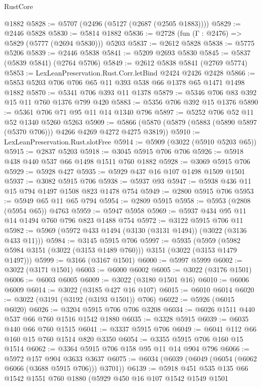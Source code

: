 \begin{lexlean}{RustCore}
\begin{coremodule}
    @1882
@5828 := @5707 (@2496 (@5127 (@2687 (@2505 @1883))))
@5829 := @2446 @5828
@5830 := @5814 @1882
@5836 := @2728 (fun (Γ : @2476) => @5829 (@5777 (@2694 @5830))) @5203
@5837 := @2612 @5828
@5838 := @5775 @5206
@5839 := @2446 @5838
@5841 := @5209 @2693 @5830
@5845 := @5837 (@5839 @5841) (@2764 @5706)
@5849 := @2612 @5838 @5841 (@2769 @5774)
@5853 := LexLeanPreservation.Rust.Corr.letBind @2424 @2426 @2428
@5866 := @5853 @5203 @706 @706 @65 @11 @393 @538 @66 @1378 @65 @1471 @1498 @1882
@5870 := @5341 @706 @393 @11 @1378
@5879 := @5346 @706 @83 @392 @15 @11 @760 @1376 @799 @420
@5883 := @5356 @706 @392 @15 @1376
@5890 := @5361 @706 @71 @95 @11 @14 @1340 @796
@5897 := @5252 @706 @52 @11 @52 @1340 @5260 @5263
@5909 := @5866 (@5870 (@5879 (@5883 (@5890 @5897 (@5370 @706))) @4266 @4269 @4272 @4275 @3819))
@5910 := LexLeanPreservation.Rust.slotFree
@5914 := @5909 (@3022 (@5910 @5203 @65))
@5915 := @2837 @5203
@5918 := @3045 @5915 @706 @706
@5926 := @5918 @438 @440 @537 @66 @1498 @1511 @760 @1882
@5928 := @3069 @5915 @706
@5929 := @5928 @427
@5935 := @5929 @437 @16 @107 @1498 @1509 @1501
@5937 := @3082 @5915 @706
@5938 := @5937 @93
@5947 := @5938 @436 @11 @15 @794 @1497 @1508 @823 @1478 @754
@5949 := @2800 @5915 @706
@5953 := @5949 @65 @11 @65 @794
@5954 := @2809 @5915
@5958 := @5953 (@2808 (@5954 @65)) @4763
@5959 := @5947 @5958
@5969 := @5937 @434 @95 @11 @14 @1494 @760 @796 @823 @1488 @754
@5972 := @3122 @5915 @706 @11
@5982 := @5969 (@5972 @433 @1494 (@3130 (@3131 @1494)) (@3022 (@3136 @433 @11)))
@5984 := @3145 @5915 @706
@5997 := @5935
    (@5959 (@5982 @5984 @3151 (@3022 (@3153 @1489 @760))) @3151 (@3022 (@3153 @1479 @1497)))
@5999 := @3166 (@3167 @1501)
@6000 := @5997 @5999
@6002 := @3022 (@3171 @1501)
@6003 := @6000 @6002
@6005 := @3022 (@3176 @1501)
@6006 := @6003 @6005
@6009 := @3022 (@3180 @1501 @16)
@6010 := @6006 @6009
@6014 := @3022 (@3185 @427 @16 @107)
@6015 := @6010 @6014
@6020 := @3022 (@3191 (@3192 (@3193 @1501)) @706)
@6022 := @5926 (@6015 @6020)
@6026 := @3204 @5915 @706 @706 @3208
@6034 := @6026 @1511 @440 @537 @66 @760 @1516 @1542 @1880
@6035 := @3328 @5915
@6039 := @6035 @440 @66 @760 @1515
@6041 := @3337 @5915 @706
@6049 := @6041 @112 @66 @160 @15 @760 @1514 @820 @3350
@6054 := @3355 @5915 @706 @160 @15 @1514
@6062 := @3364 @5915 @706 @158 @95 @11 @14 @904 @796
@6066 := @5972 @157 @904 @3633 @3637
@6075 := @6034 (@6039 (@6049 (@6054 (@6062 @6066 (@3688 @5915 @706))) @3701))
@6139 := @5918
    @451
    @535
    @135
    @66
    @1542
    @1551
    @760
    @1880
    (@5929
      @450
      @16
      @107
      @1542
      @1549
      @1501

\end{coremodule}
\end{lexlean}
